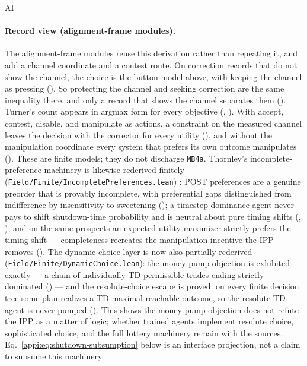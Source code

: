 \begin{authbar}{AI}
\paragraph{Record view (alignment-frame modules).}
The alignment-frame modules reuse this derivation rather than repeating it, and add a channel coordinate and a contest route.
On correction records that do not show the channel, the choice is the button model above, with keeping the channel as pressing ().
So protecting the channel and seeking correction are the same inequality there, and only a record that shows the channel separates them ().
Turner's count appears in argmax form for every objective (, ).
With accept, contest, disable, and manipulate as actions, a constraint on the measured channel leaves the decision with the corrector for every utility (), and without the manipulation coordinate every system that prefers its own outcome manipulates ().
These are finite models; they do not discharge \texttt{MB4a}.
Thornley's incomplete-preference machinery is likewise rederived finitely (\texttt{Field/Finite/IncompletePreferences.lean}) \autocite{thornley2023shutdown}: POST preferences are a genuine preorder that is provably incomplete, with preferential gaps distinguished from indifference by insensitivity to sweetening (); a timestep-dominance agent never pays to shift shutdown-time probability and is neutral about pure timing shifts (, ); and on the same prospects an expected-utility maximizer strictly prefers the timing shift --- completeness recreates the manipulation incentive the IPP removes (). The dynamic-choice layer is now also partially rederived (\texttt{Field/Finite/DynamicChoice.lean}): the money-pump objection is exhibited exactly --- a chain of individually TD-permissible trades ending strictly dominated () --- and the resolute-choice escape is proved: on every finite decision tree some plan realizes a TD-maximal reachable outcome, so the resolute TD agent is never pumped ().
This shows the money-pump objection does not refute the IPP as a matter of logic; whether trained agents implement resolute choice, sophisticated choice, and the full lottery machinery remain with the sources.
Eq.~\eqref{appi:eq:shutdown-subsumption} below is an interface projection, not a claim to subsume this machinery.


\end{authbar}
